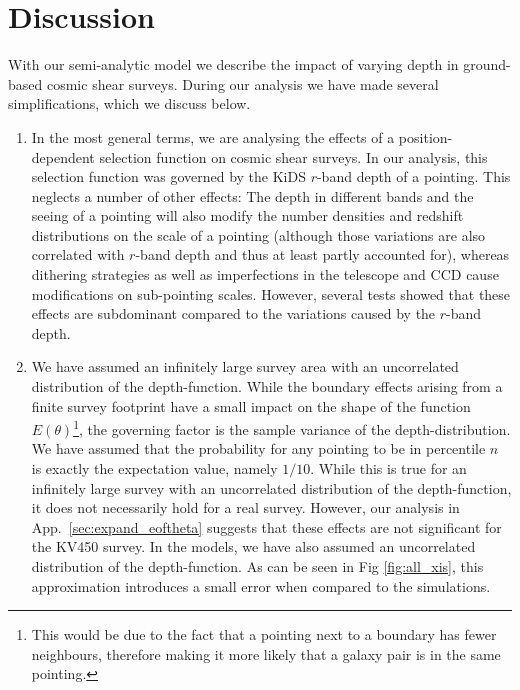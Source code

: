 \documentclass{aa}
\begin{document}
\section{Discussion}
\label{sec:discussion}
With our semi-analytic model we describe the impact of varying depth in ground-based cosmic shear surveys. During our analysis we have made several simplifications, which we discuss below.
\begin{enumerate}
\item In the most general terms, we are analysing the effects of a position-dependent selection function on cosmic shear surveys. In our analysis, this selection function was governed by the KiDS $r$-band depth of a pointing. This neglects a number of other effects: The depth in different bands and the seeing of a pointing will also modify the number densities and redshift distributions on the scale of a pointing (although those variations are also correlated with $r$-band depth and thus at least partly accounted for), whereas dithering strategies as well as imperfections in the telescope and CCD cause modifications on sub-pointing scales. However, several tests showed that these effects are subdominant compared to the variations caused by the $r$-band depth.

\item We have assumed an infinitely large survey area with an uncorrelated distribution of the depth-function. While the boundary effects arising from a finite survey footprint have a small impact on the shape of the function $E(\theta)$\footnote{This would be due to the fact that a pointing next to a boundary has fewer neighbours, therefore making it more likely that a galaxy pair is in the same pointing.}, the governing factor is the sample variance of the depth-distribution. We have assumed that the probability for any pointing to be in percentile $n$ is exactly the expectation value, namely $1/10$. While this is true for an infinitely large survey with an uncorrelated distribution of the depth-function, it does not necessarily hold for a real survey. However, our analysis in App.~\ref{sec:expand_eoftheta} suggests that these effects are not significant for the KV450 survey. In the models, we have also assumed an uncorrelated distribution of the depth-function. As can be seen in Fig \ref{fig:all_xis}, this approximation introduces a small error when compared to the simulations.


\end{enumerate}
\end{document}
